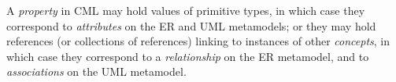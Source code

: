A \emph{property} in CML may hold values of primitive types,
in which case they correspond to \emph{attributes}
on the ER \cite{er} and UML \cite{uml} metamodels;
or they may hold references (or collections of references)
linking to instances of other \emph{concepts},
in which case they correspond to a \emph{relationship} on the ER metamodel,
and to \emph{associations} on the UML metamodel.